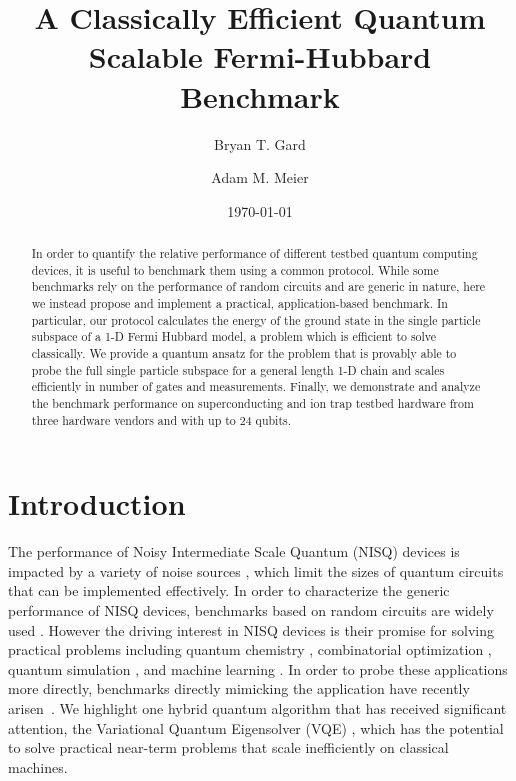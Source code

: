 \documentclass[
prx,
superscriptaddress,
twocolumn,
longbibliography
]{revtex4-1}
\begin{document}
\title{A Classically Efficient Quantum Scalable Fermi-Hubbard Benchmark}

\author{Bryan T. Gard}
\author{Adam M. Meier}
\date{\today}

\begin{abstract}
In order to quantify the relative performance of different testbed quantum computing devices, it is useful to benchmark them using a common protocol. While some benchmarks rely on the performance of random circuits and are generic in nature, here we instead propose and implement a practical, application-based benchmark. In particular, our protocol calculates the energy of the ground state in the single particle subspace of a 1-D Fermi Hubbard model, a problem which is efficient to solve classically. We provide a quantum ansatz for the problem that is provably able to probe the full single particle subspace for a general length 1-D chain and scales efficiently in number of gates and measurements. Finally, we demonstrate and analyze the benchmark performance on superconducting and ion trap testbed hardware from three hardware vendors and with up to 24 qubits.
\end{abstract}

\maketitle

\section{Introduction}
The performance of Noisy Intermediate Scale Quantum (NISQ) devices is impacted by a variety of noise sources \cite{Preskill2018quantumcomputingin}, which limit the sizes of quantum circuits that can be implemented effectively. In order to characterize the generic performance of NISQ devices, benchmarks based on random circuits are widely used \cite{Emerson_2005,PhysRevA.80.012304,PhysRevA.77.012307,PhysRevLett.109.240504,PhysRevA.100.032328,Moll_2018,BlumeKohout2020volumetricframework}. However the driving interest in NISQ devices is their promise for solving practical problems including quantum chemistry \cite{doi:10.1021/acs.chemrev.8b00803,Google_chemsitry}, combinatorial optimization \cite{farhi2014quantum,farhi2019quantum,PhysRevE.99.013304,rajakumar2020generating,martiel2021benchmarking}, quantum simulation \cite{Buluta108,Britton2012}, and machine learning \cite{Biamonte2017,doi:10.1080/00107514.2014.964942}. In order to probe these applications more directly, benchmarks directly mimicking the application have recently arisen~\cite{dallairedemers2020application,karamlou2021analyzing,martiel2021benchmarking}. We highlight one hybrid quantum algorithm that has received significant attention, the Variational Quantum Eigensolver (VQE) \cite{Peruzzo2014,kandala2017hardware,PhysRevLett.122.140504,PhysRevLett.122.230401,gard2019efficient,McCaskey2019qchem,Cade_2020}, which has the potential to solve practical near-term problems that scale inefficiently on classical machines. 
\end{document}
